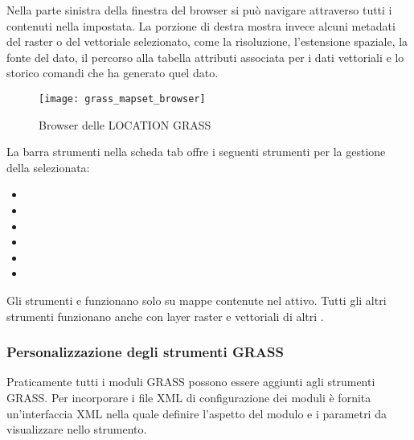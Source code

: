 Nella parte sinistra della finestra del browser si può navigare attraverso
tutti i  contenuti nella  impostata. La
porzione di destra mostra invece alcuni metadati del raster o del vettoriale
selezionato, come la risoluzione, l'estensione spaziale, la fonte del dato, il
percorso alla tabella attributi associata per i dati vettoriali e lo storico
comandi che ha generato quel dato.

\begin{figure}[h]
 \begin{center}
 \caption{Browser delle LOCATION GRASS \nixcaption}\label{fig:grass_mapset_browser}
 \texttt{[image: grass\_mapset\_browser]}
 \end{center}
\end{figure}

La barra strumenti nella scheda  tab offre i seguenti
strumenti per la gestione della  selezionata:

\begin{itemize}
\item {}
\item {}
\item {}
\item {}
\item {}
\item {}
\end{itemize}

Gli strumenti  e
 funzionano solo su
mappe contenute nel  attivo. Tutti gli altri strumenti
funzionano anche con layer raster e vettoriali di altri .

\subsubsection{Personalizzazione degli strumenti GRASS} 
\label{sec:toolbox-customizing}

Praticamente tutti i moduli GRASS possono essere aggiunti agli strumenti
GRASS. Per incorporare i file XML di configurazione dei moduli è fornita
un'interfaccia XML nella quale definire l'aspetto del modulo e i parametri
da visualizzare nello strumento.

